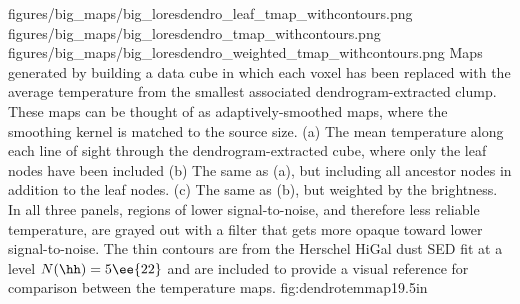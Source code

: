 \RotFigureThreeAA
{figures/big_maps/big_loresdendro_leaf_tmap_withcontours.png}
{figures/big_maps/big_loresdendro_tmap_withcontours.png}
{figures/big_maps/big_loresdendro_weighted_tmap_withcontours.png}
{Maps generated by building a data cube in which each voxel has been replaced
with the average temperature from the smallest associated dendrogram-extracted
clump.  These maps can be thought of as adaptively-smoothed maps, where the
smoothing kernel is matched to the source size.
(a) The mean temperature along each line of sight through the dendrogram-extracted
cube, where only the leaf nodes have been included
\newline
(b) The same as (a), but including all ancestor nodes in addition to the leaf
nodes. 
\newline
(c) The same as (b), but weighted by the \threeohthree brightness.
\newline
In all three panels, regions of lower signal-to-noise, and therefore less
reliable
temperature, are grayed out with a filter that gets more opaque toward lower
signal-to-noise.  The thin contours are from the Herschel HiGal
dust SED fit at a level $N(\hh)=5\ee{22}$ \persc and are included to provide a
visual reference for comparison between the temperature maps.
}
{fig:dendrotemmap}{1}{9.5in}

% 
% 

